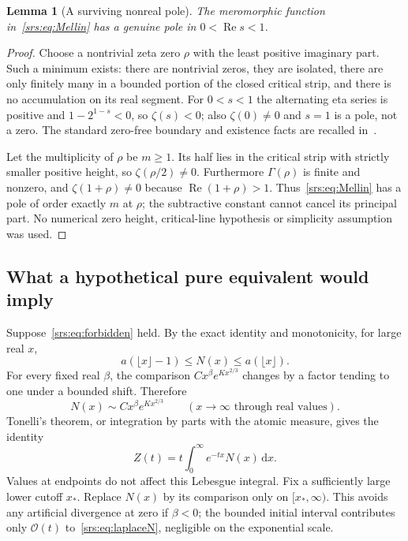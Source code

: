 \documentclass[11pt]{article}
\numberwithin{equation}{section}
\newtheorem{lemma}[theorem]{Lemma}
\theoremstyle{remark}\newtheorem{remark}[theorem]{Remark}
\newcommand{\Oh}{\mathcal O}
\newcommand{\dd}{\,\mathrm d}
\DeclareMathOperator{\Ree}{Re}
\begin{document}
\begin{lemma}[A surviving nonreal pole]\label{srs:lem:pole}
The meromorphic function in~\eqref{srs:eq:Mellin} has a genuine pole in $0<\Ree s<1$.
\end{lemma}
\begin{proof}
Choose a nontrivial zeta zero $\rho$ with the least positive imaginary part. Such a minimum exists: there are nontrivial zeros, they are isolated, there are only finitely many in a bounded portion of the closed critical strip, and there is no accumulation on its real segment. For $0<s<1$ the alternating eta series is positive and $1-2^{1-s}<0$, so $\zeta(s)<0$; also $\zeta(0)\ne0$ and $s=1$ is a pole, not a zero. The standard zero-free boundary and existence facts are recalled in~\cite{DLMF}.

Let the multiplicity of $\rho$ be $m\ge1$. Its half lies in the critical strip with strictly smaller positive height, so $\zeta(\rho/2)\ne0$. Furthermore $\Gamma(\rho)$ is finite and nonzero, and $\zeta(1+\rho)\ne0$ because $\Ree(1+\rho)>1$. Thus~\eqref{srs:eq:Mellin} has a pole of order exactly $m$ at $\rho$; the subtractive constant cannot cancel its principal part. No numerical zero height, critical-line hypothesis or simplicity assumption was used.
\end{proof}

\subsection{What a hypothetical pure equivalent would imply}
Suppose~\eqref{srs:eq:forbidden} held. By the exact identity and monotonicity, for large real $x$,
\[
 a(\lfloor x\rfloor-1)\le N(x)\le a(\lfloor x\rfloor).
\]
For every fixed real $\beta$, the comparison $C x^\beta e^{Kx^{2/3}}$ changes by a factor tending to one under a bounded shift. Therefore
\begin{equation}
 N(x)\sim Cx^\beta e^{Kx^{2/3}}\qquad(x\to\infty\text{ through real values}).
 \label{srs:eq:hypreal}
\end{equation}
Tonelli's theorem, or integration by parts with the atomic measure, gives the identity
\begin{equation}
 Z(t)=t\int_0^\infty e^{-tx}N(x)\dd x.\label{srs:eq:laplaceN}
\end{equation}
Values at endpoints do not affect this Lebesgue integral. Fix a sufficiently large lower cutoff $x_*$. Replace $N(x)$ by its comparison only on $[x_*,\infty)$. This avoids any artificial divergence at zero if $\beta<0$; the bounded initial interval contributes only $\Oh(t)$ to~\eqref{srs:eq:laplaceN}, negligible on the exponential scale.
\end{document}
